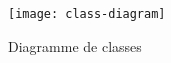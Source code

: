 \begin{figure}[ht]
    \centering
    \caption{Diagramme de classes}
    \texttt{[image: class-diagram]}
    \label{fig:class-diagram}
\end{figure}
\pagebreak
